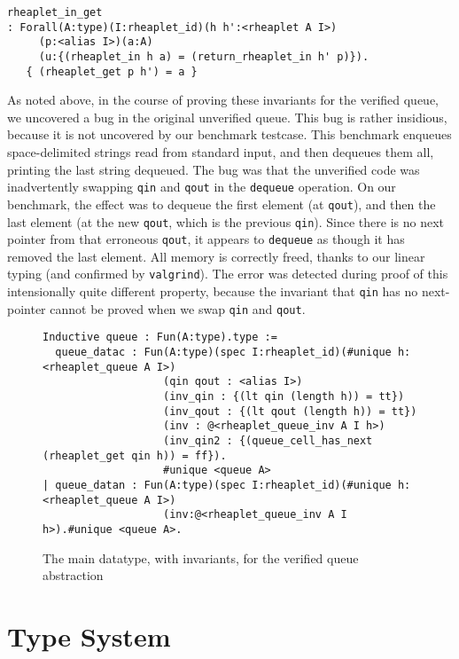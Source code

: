 \documentclass[9pt,natbib]{sigplanconf}
\begin{document}
{\small
\begin{verbatim}
rheaplet_in_get
: Forall(A:type)(I:rheaplet_id)(h h':<rheaplet A I>)
     (p:<alias I>)(a:A)
     (u:{(rheaplet_in h a) = (return_rheaplet_in h' p)}).
   { (rheaplet_get p h') = a }
\end{verbatim}
}
  
As noted above, in the course of proving these invariants for the
verified queue, we uncovered a bug in the original unverified queue.
This bug is rather insidious, because it is not uncovered by our
benchmark testcase.  This benchmark enqueues space-delimited strings
read from standard input, and then dequeues them all, printing the
last string dequeued.  The bug was that the unverified code was
inadvertently swapping \texttt{qin} and \texttt{qout} in the
\texttt{dequeue} operation.  On our benchmark, the effect was to
dequeue the first element (at \texttt{qout}), and then the last
element (at the new \texttt{qout}, which is the previous
\texttt{qin}).  Since there is no next pointer from that erroneous
\texttt{qout}, it appears to \texttt{dequeue} as though it has removed
the last element.  All memory is correctly freed, thanks to our linear
typing (and confirmed by \texttt{valgrind}).  The error was detected
during proof of this intensionally quite different property, because
the invariant that \texttt{qin} has no next-pointer cannot be proved
when we swap \texttt{qin} and \texttt{qout}.

\begin{figure*}
\begin{verbatim}
Inductive queue : Fun(A:type).type :=
  queue_datac : Fun(A:type)(spec I:rheaplet_id)(#unique h:<rheaplet_queue A I>)
                   (qin qout : <alias I>)
                   (inv_qin : {(lt qin (length h)) = tt})
                   (inv_qout : {(lt qout (length h)) = tt})
                   (inv : @<rheaplet_queue_inv A I h>)
                   (inv_qin2 : {(queue_cell_has_next (rheaplet_get qin h)) = ff}).
                   #unique <queue A>
| queue_datan : Fun(A:type)(spec I:rheaplet_id)(#unique h:<rheaplet_queue A I>)
                   (inv:@<rheaplet_queue_inv A I h>).#unique <queue A>.
\end{verbatim}
\label{fig:queue2}
\caption{The main datatype, with invariants, for the verified queue abstraction}
\end{figure*}

\section{Type System}
\end{document}
